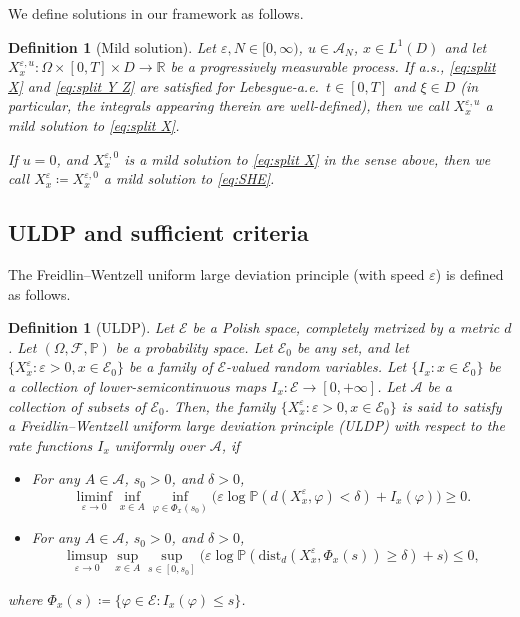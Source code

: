 \documentclass{amsart}
\theoremstyle{plain}
\theoremstyle{remark}
\theoremstyle{plain}
\newtheorem{definition}[theorem]{Definition}
\numberwithin{equation}{section}
\newcommand{\R}{\mathbb{R}}
\newcommand{\ceqq}{\coloneqq}
\newcommand{\col}{\colon}
\newcommand{\eps}{\varepsilon}
\newcommand{\Om}{\Omega}
\newcommand{\A}{{\mathcal A}}
\begin{document}
We define solutions in our framework as follows. 
 
\begin{definition}[Mild solution]\label{def:sol}
Let $\eps,N\in[0,\infty)$, $u\in \A_N$, $x\in L^1(D)$ and let $X_x^{\eps,u}\col \Om\times [0,T]\times D\to \R$ be a progressively measurable  process. 
If a.s., \eqref{eq:split X} and \eqref{eq:split Y Z} are  satisfied for Lebesgue-a.e.\ $t\in[0,T]$ and $\xi\in D$ (in particular, the integrals appearing therein are well-defined), then we call $X_x^{\eps,u}$ a \emph{mild solution to \eqref{eq:split X}}. 

If $u=0$, and $X_x^{\eps,0}$ is a mild solution to \eqref{eq:split X} in the sense above, then we call $X_x^\eps\ceqq X_x^{\eps,0}$ a mild solution to \eqref{eq:SHE}.
\end{definition}






\subsection{ULDP and sufficient criteria}
 
The Freidlin--Wentzell uniform large deviation principle (with speed $\eps$) is defined as follows. 
\begin{definition}[ULDP]\label{def:uldp}
Let $\mathcal{E}$ be a Polish space, completely metrized by a metric $d$. 
Let $(\Omega, \mathcal{F}, \mathbb{P})$ be a probability space.  Let $ \mathcal{E}_0$ be any set, and let $\{X^\eps_x: \eps>0,x\in \mathcal{E}_0\}$ be a family of $\mathcal{E}$-valued random variables. Let $\{I_x : x \in \mathcal{E}_0\}$ be a collection of lower-semicontinuous maps $I_x : \mathcal{E} \to [0,+\infty]$. 
Let $\mathscr{A}$ be a collection of subsets of $\mathcal{E}_0$.  
Then, the family $\{X^\eps_x: \eps>0,x\in \mathcal{E}_0\}$ is said to satisfy a \emph{Freidlin--Wentzell uniform large deviation principle (ULDP) with respect to the rate functions $I_x$ uniformly over $\mathscr{A}$}, if
\begin{itemize}
\item For any $A \in \mathscr{A}$, $s_0 > 0$, and $\delta > 0$,
\[
\liminf_{\eps \to 0} \inf_{x \in A} \inf_{\varphi \in \Phi_x(s_0)} \big(\eps\log \mathbb{P}(d(X^\eps_x, \varphi) < \delta) + I_x(\varphi)\big) \geq 0.
\]
\item For any $A \in \mathscr{A}$, $s_0 > 0$, and $\delta > 0$,
\[
\limsup_{\eps \to 0} \sup_{x \in A} \sup_{s \in [0,s_0]} \big(\eps \log \mathbb{P}(\mathrm{dist}_d(X^\eps_x, \Phi_x(s)) \geq \delta) + s\big) \leq 0,
\]
\end{itemize}
where $\Phi_x(s) \ceqq \{\varphi \in \mathcal{E} : I_x(\varphi) \leq s\}$. 
\end{definition}
\end{document}

